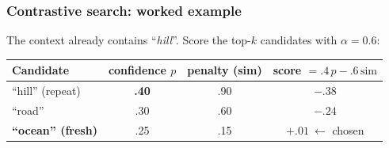 \documentclass[aspectratio=169]{beamer}
\begin{document}
\begin{frame}
\frametitle{Contrastive search: worked example}

\vspace{0.1cm}
\begin{center}
\small The context already contains ``\textit{hill}''. Score the top-$k$ candidates with $\alpha = 0.6$:
\end{center}

\vspace{0.15cm}
\begin{center}
\renewcommand{\arraystretch}{1.4}
\small
\begin{tabular}{l | c | c | c}
\textbf{Candidate} & \textcolor{popblue}{confidence $p$} & \textcolor{sampred}{penalty (sim)} & \textbf{score} $= .4\,p - .6\,\mathrm{sim}$ \\
\hline
``hill'' (repeat)   & \textbf{.40} & .90 & $-.38$ \\
``road''            & .30 & .60 & $-.24$ \\
\textcolor{paramgreen}{\textbf{``ocean'' (fresh)}} & \textcolor{paramgreen}{.25} & \textcolor{paramgreen}{.15} & \textcolor{paramgreen}{$\mathbf{+.01}\ \leftarrow$ chosen} \\
\end{tabular}
\end{center}

\vspace{0.25cm}
\begin{center}
\end{center}
\end{frame}
\end{document}
